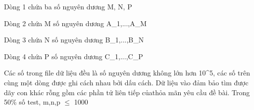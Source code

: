 Dòng 1 chứa ba số nguyên dương M, N, P

Dòng 2 chứa M số nguyên dương A\_1,...,A\_M

Dòng 3 chứa N số nguyên dương B\_1,...,B\_N

Dòng 4 chứa P số nguyên dương C\_1,...,C\_P

Các số trong file dữ liệu đều là số nguyên dương không lớn hơn 10^5, các số trên cùng một dòng được ghi cách nhau bởi dấu cách. Dữ liệu vào đảm bảo tìm được dãy con khác rỗng gồm các phần tử liên tiếp củathỏa mãn yêu cầu đề bài. Trong 50\% số test, m,n,p  $\le$  1000